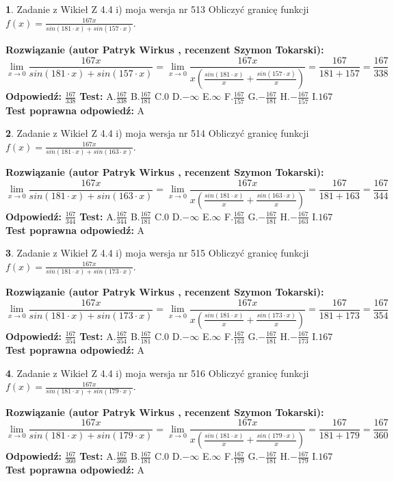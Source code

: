 \documentclass[12pt, a4paper]{article}
\theoremstyle{definition} %
\newtheorem{zad}{}
\newcommand{\zadStart}[1]{\begin{zad}#1\newline}
\newcommand{\zadStop}{\end{zad}}
\newcommand{\rozwStart}[2]{\noindent \textbf{Rozwiązanie (autor #1 , recenzent #2): }\newline}
\newcommand{\rozwStop}{\newline}
\newcommand{\odpStart}{\noindent \textbf{Odpowiedź:}\newline}
\newcommand{\odpStop}{\newline}
\newcommand{\testStart}{\noindent \textbf{Test:}\newline}
\newcommand{\testStop}{\newline}
\newcommand{\kluczStart}{\noindent \textbf{Test poprawna odpowiedź:}\newline}
\newcommand{\kluczStop}{\newline}
\begin{document}
\zadStart{Zadanie z Wikieł Z 4.4 i) moja wersja nr 513}
Obliczyć granicę funkcji $f(x)=\frac{167x}{sin(181\cdot x) +sin(157\cdot x)}$.
\zadStop
\rozwStart{Patryk Wirkus}{Szymon Tokarski}
$$\lim\limits_{x\to 0}\frac{167x}{sin(181\cdot x) +sin(157\cdot x)}=\lim\limits_{x\to 0}\frac{167x}{x(\frac{sin(181\cdot x)}{x}+\frac{sin(157\cdot x)}{x})}=\frac{167}{181+157} = \frac{167}{338}$$
\rozwStop
\odpStart
$\frac{167}{338}$
\odpStop
\testStart
A.$\frac{167}{338}$
B.$\frac{167}{181}$
C.$0$
D.$-\infty$
E.$\infty$
F.$\frac{167}{157}$
G.$-\frac{167}{181}$
H.$-\frac{167}{157}$
I.$167$
\testStop
\kluczStart
A
\kluczStop



\zadStart{Zadanie z Wikieł Z 4.4 i) moja wersja nr 514}
Obliczyć granicę funkcji $f(x)=\frac{167x}{sin(181\cdot x) +sin(163\cdot x)}$.
\zadStop
\rozwStart{Patryk Wirkus}{Szymon Tokarski}
$$\lim\limits_{x\to 0}\frac{167x}{sin(181\cdot x) +sin(163\cdot x)}=\lim\limits_{x\to 0}\frac{167x}{x(\frac{sin(181\cdot x)}{x}+\frac{sin(163\cdot x)}{x})}=\frac{167}{181+163} = \frac{167}{344}$$
\rozwStop
\odpStart
$\frac{167}{344}$
\odpStop
\testStart
A.$\frac{167}{344}$
B.$\frac{167}{181}$
C.$0$
D.$-\infty$
E.$\infty$
F.$\frac{167}{163}$
G.$-\frac{167}{181}$
H.$-\frac{167}{163}$
I.$167$
\testStop
\kluczStart
A
\kluczStop



\zadStart{Zadanie z Wikieł Z 4.4 i) moja wersja nr 515}
Obliczyć granicę funkcji $f(x)=\frac{167x}{sin(181\cdot x) +sin(173\cdot x)}$.
\zadStop
\rozwStart{Patryk Wirkus}{Szymon Tokarski}
$$\lim\limits_{x\to 0}\frac{167x}{sin(181\cdot x) +sin(173\cdot x)}=\lim\limits_{x\to 0}\frac{167x}{x(\frac{sin(181\cdot x)}{x}+\frac{sin(173\cdot x)}{x})}=\frac{167}{181+173} = \frac{167}{354}$$
\rozwStop
\odpStart
$\frac{167}{354}$
\odpStop
\testStart
A.$\frac{167}{354}$
B.$\frac{167}{181}$
C.$0$
D.$-\infty$
E.$\infty$
F.$\frac{167}{173}$
G.$-\frac{167}{181}$
H.$-\frac{167}{173}$
I.$167$
\testStop
\kluczStart
A
\kluczStop



\zadStart{Zadanie z Wikieł Z 4.4 i) moja wersja nr 516}
Obliczyć granicę funkcji $f(x)=\frac{167x}{sin(181\cdot x) +sin(179\cdot x)}$.
\zadStop
\rozwStart{Patryk Wirkus}{Szymon Tokarski}
$$\lim\limits_{x\to 0}\frac{167x}{sin(181\cdot x) +sin(179\cdot x)}=\lim\limits_{x\to 0}\frac{167x}{x(\frac{sin(181\cdot x)}{x}+\frac{sin(179\cdot x)}{x})}=\frac{167}{181+179} = \frac{167}{360}$$
\rozwStop
\odpStart
$\frac{167}{360}$
\odpStop
\testStart
A.$\frac{167}{360}$
B.$\frac{167}{181}$
C.$0$
D.$-\infty$
E.$\infty$
F.$\frac{167}{179}$
G.$-\frac{167}{181}$
H.$-\frac{167}{179}$
I.$167$
\testStop
\kluczStart
A
\kluczStop
\end{document}
